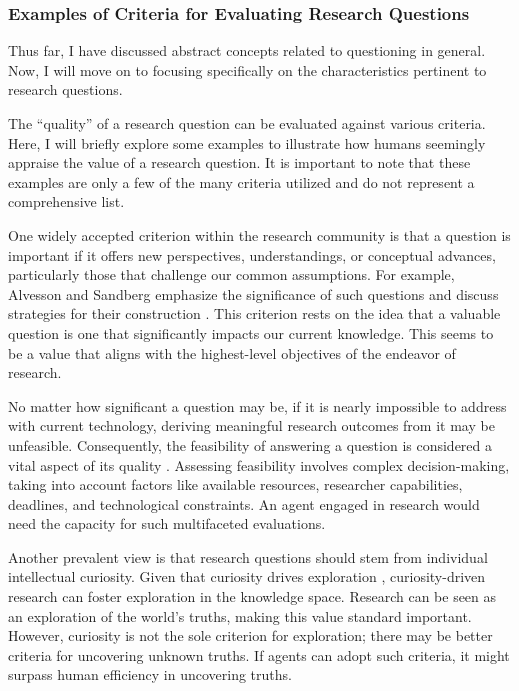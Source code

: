 \subsubsection{Examples of Criteria for Evaluating Research Questions}

Thus far, I have discussed abstract concepts related to questioning in general. Now, I will move on to focusing specifically on the characteristics pertinent to research questions.

The ``quality'' of a research question can be evaluated against various criteria. Here, I will briefly explore some examples to illustrate how humans seemingly appraise the value of a research question. It is important to note that these examples are only a few of the many criteria utilized and do not represent a comprehensive list. 

One widely accepted criterion within the research community is that a question is important if it offers new perspectives, understandings, or conceptual advances, particularly those that challenge our common assumptions. For example, Alvesson and Sandberg emphasize the significance of such questions and discuss strategies for their construction \cite{alvesson2013constructing}. This criterion rests on the idea that a valuable question is one that significantly impacts our current knowledge. This seems to be a value that aligns with the highest-level objectives of the endeavor of research.

No matter how significant a question may be, if it is nearly impossible to address with current technology, deriving meaningful research outcomes from it may be unfeasible. Consequently, the feasibility of answering a question is considered a vital aspect of its quality \cite{hulley2007designing,alon2009choose,huntington2021effect}. Assessing feasibility involves complex decision-making, taking into account factors like available resources, researcher capabilities, deadlines, and technological constraints. An agent engaged in research would need the capacity for such multifaceted evaluations.

Another prevalent view is that research questions should stem from individual intellectual curiosity. Given that curiosity drives exploration \cite{oudeyer2018computational}, curiosity-driven research can foster exploration in the knowledge space. Research can be seen as an exploration of the world's truths, making this value standard important. However, curiosity is not the sole criterion for exploration; there may be better criteria for uncovering unknown truths. If agents can adopt such criteria, it might surpass human efficiency in uncovering truths.

